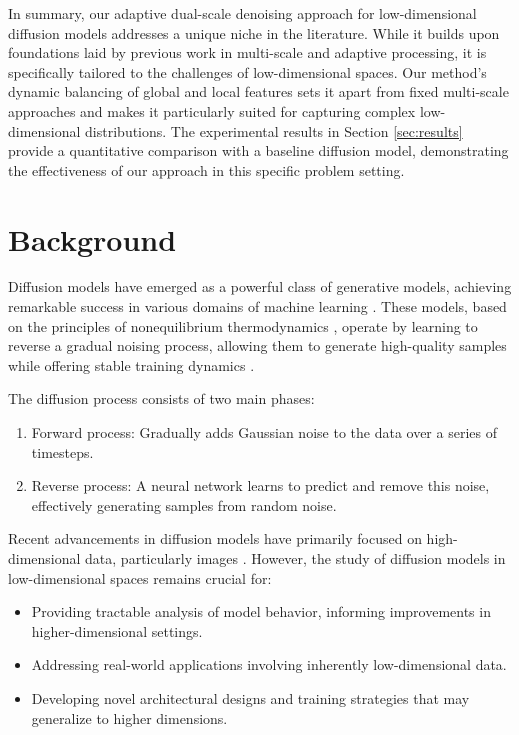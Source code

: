 \documentclass{article} %
\begin{document}
In summary, our adaptive dual-scale denoising approach for low-dimensional diffusion models addresses a unique niche in the literature. While it builds upon foundations laid by previous work in multi-scale and adaptive processing, it is specifically tailored to the challenges of low-dimensional spaces. Our method's dynamic balancing of global and local features sets it apart from fixed multi-scale approaches and makes it particularly suited for capturing complex low-dimensional distributions. The experimental results in Section \ref{sec:results} provide a quantitative comparison with a baseline diffusion model, demonstrating the effectiveness of our approach in this specific problem setting.

\section{Background}
\label{sec:background}

Diffusion models have emerged as a powerful class of generative models, achieving remarkable success in various domains of machine learning \cite{yang2023diffusion}. These models, based on the principles of nonequilibrium thermodynamics \cite{pmlr-v37-sohl-dickstein15}, operate by learning to reverse a gradual noising process, allowing them to generate high-quality samples while offering stable training dynamics \cite{ddpm}.

The diffusion process consists of two main phases:
\begin{enumerate}
    \item Forward process: Gradually adds Gaussian noise to the data over a series of timesteps.
    \item Reverse process: A neural network learns to predict and remove this noise, effectively generating samples from random noise.
\end{enumerate}

Recent advancements in diffusion models have primarily focused on high-dimensional data, particularly images \cite{edm}. However, the study of diffusion models in low-dimensional spaces remains crucial for:
\begin{itemize}
    \item Providing tractable analysis of model behavior, informing improvements in higher-dimensional settings.
    \item Addressing real-world applications involving inherently low-dimensional data.
    \item Developing novel architectural designs and training strategies that may generalize to higher dimensions.
\end{itemize}
\end{document}
